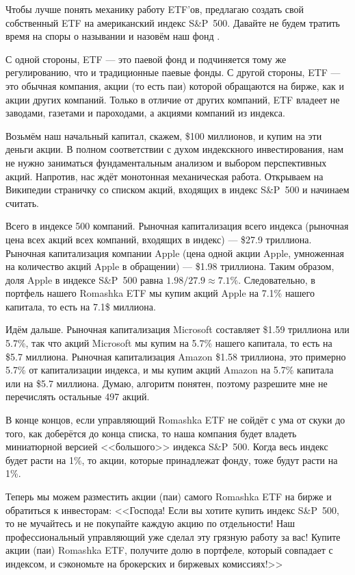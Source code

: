 Чтобы лучше понять механику работу ETF'ов, предлагаю создать свой собственный ETF на американский индекс S\&P~500. Давайте не будем тратить время на споры о назывании и назовём наш фонд .

С одной стороны, ETF --- это паевой фонд и подчиняется тому же регулированию, что и традиционные паевые фонды. С другой стороны, ETF --- это обычная компания, акции (то есть паи) которой обращаются на бирже, как и акции других компаний. Только в отличие от других компаний, ETF владеет не заводами, газетами и пароходами, а акциями компаний из индекса.

Возьмём наш начальный капитал, скажем, \$100 миллионов, и купим на эти деньги акции. В полном соответствии с духом индекскного инвестирования, нам не нужно заниматься фундаментальным анализом и выбором перспективных акций. Напротив, нас ждёт монотонная механическая работа. Открываем на Википедии страничку со списком акций, входящих в индекс S\&P~500 и начинаем считать.

Всего в индексе 500 компаний. Рыночная капитализация всего индекса (рыночная цена всех акций всех компаний, входящих в индекс) --- \$27.9 триллиона. Рыночная капитализация компании Apple (цена одной акции Apple, умноженная на количество акций Apple в обращении) --- \$1.98 триллиона. Таким образом, доля Apple в индексе S\&P~500 равна $1.98/27.9 \approx 7.1\%$. Следовательно, в портфель нашего Romashka ETF мы купим акций Apple на 7.1\% нашего капитала, то есть на 7.1\$ миллиона.

Идём дальше. Рыночная капитализация Microsoft составляет \$1.59 триллиона или 5.7\%, так что акций Microsoft мы купим на 5.7\% нашего капитала, то есть на \$5.7 миллиона. Рыночная капитализация Amazon \$1.58 триллиона, это примерно 5.7\% от капитализации индекса, и мы купим акций Amazon на 5.7\% капитала или на \$5.7 миллиона. Думаю, алгоритм понятен, поэтому разрешите мне не перечислять остальные 497 акций.

В конце концов, если управляющий Romashka ETF не сойдёт с ума от скуки до того, как доберётся до конца списка, то наша компания будет владеть миниатюрной версией <<большого>> индекса S\&P~500. Когда весь индекс будет расти на 1\%, то акции, которые принадлежат фонду, тоже будут расти на 1\%.

Теперь мы можем разместить акции (паи) самого Romashka ETF на бирже и обратиться к инвесторам: <<Господа! Если вы хотите купить индекс S\&P~500, то не мучайтесь и не покупайте каждую акцию по отдельности! Наш профессиональный управляющий уже сделал эту грязную работу за вас! Купите акции (паи) Romashka ETF, получите долю в портфеле, который совпадает с индексом, и сэкономьте на брокерских и биржевых комиссиях!>>

